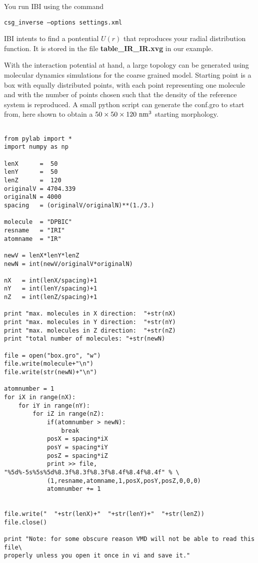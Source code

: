 You run IBI using the command

\texttt{csg\_inverse --options settings.xml}

IBI intents to find a pontential $U(r)$ that reproduces your radial distribution function. It is stored in the file \textbf{table\_IR\_IR.xvg} in our example.

With the interaction potential at hand, a large topology can be generated using molecular dynamics simulations for the coarse grained model. Starting point is a box with equally distributed points, with each point representing one molecule and with the number of points chosen such that the density of the reference system is reproduced. A small python script can generate the conf.gro to start from, here shown to obtain a $50\times50\times120~{\rm nm}^3$ starting morphology.

\lstset{language=Python}
\begin{lstlisting}

from pylab import *
import numpy as np

lenX      =  50
lenY      =  50 
lenZ      =  120 
originalV = 4704.339 
originalN = 4000
spacing   = (originalV/originalN)**(1./3.) 

molecule  = "DPBIC"
resname   = "IRI"
atomname  = "IR"

newV = lenX*lenY*lenZ
newN = int(newV/originalV*originalN)

nX   = int(lenX/spacing)+1
nY   = int(lenY/spacing)+1
nZ   = int(lenZ/spacing)+1

print "max. molecules in X direction:  "+str(nX)
print "max. molecules in Y direction:  "+str(nY)
print "max. molecules in Z direction:  "+str(nZ)
print "total number of molecules: "+str(newN)

file = open("box.gro", "w")
file.write(molecule+"\n")
file.write(str(newN)+"\n")

atomnumber = 1
for iX in range(nX):
    for iY in range(nY):
        for iZ in range(nZ):
            if(atomnumber > newN):
                break
            posX = spacing*iX
            posY = spacing*iY
            posZ = spacing*iZ
            print >> file, "%5d%-5s%5s%5d%8.3f%8.3f%8.3f%8.4f%8.4f%8.4f" % \
            (1,resname,atomname,1,posX,posY,posZ,0,0,0)
            atomnumber += 1


file.write("  "+str(lenX)+"  "+str(lenY)+"  "+str(lenZ))
file.close()

print "Note: for some obscure reason VMD will not be able to read this file\
properly unless you open it once in vi and save it."


\end{lstlisting}

